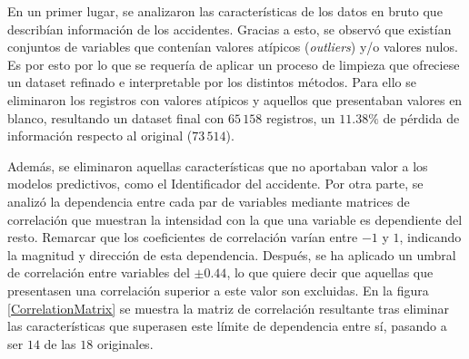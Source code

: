 \documentclass{uathesis-es}
\begin{document}
{%


En un primer lugar, se analizaron las características de los datos en bruto que describían información de los accidentes. Gracias a esto, se observó que existían conjuntos de variables que contenían valores atípicos (\textit{outliers}) y/o valores nulos. Es por esto por lo que se requería de aplicar un proceso de limpieza que ofreciese un dataset refinado e interpretable por los distintos métodos. Para ello se eliminaron los registros con valores atípicos y aquellos que presentaban valores en blanco, resultando un dataset final con $65\,158$ registros, un $11.38\%$ de pérdida de información respecto al original ($73\,514$).


Además, se eliminaron aquellas características que no aportaban valor a los modelos predictivos, como el Identificador del accidente. Por otra parte, se analizó la dependencia entre cada par de variables mediante matrices de correlación que muestran la intensidad con la que una variable es dependiente del resto. Remarcar que los coeficientes de correlación varían entre $-1$ y $1$, indicando la magnitud y dirección de esta dependencia. Después, se ha aplicado un umbral de correlación entre variables del $\pm 0.44$, lo que quiere decir que aquellas que presentasen una correlación superior a este valor son excluidas. En la figura \ref{CorrelationMatrix} se muestra la matriz de correlación resultante tras eliminar las características que superasen este límite de dependencia entre sí, pasando a ser $14$ de las $18$ originales.

}
\end{document}
